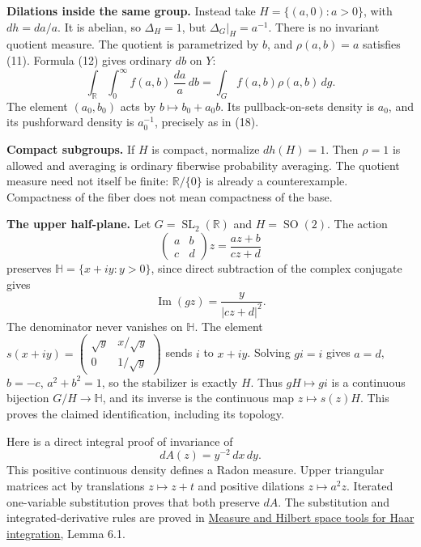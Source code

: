 \documentclass[
  english,
  11pt,
  a4paper,
]{article}
\begin{document}
\textbf{Dilations inside the same group.} Instead take
\(H=\{(a,0):a>0\}\), with \(dh=da/a\). It is abelian, so \(\Delta_H=1\),
but \(\Delta_G|_H=a^{-1}\). There is no invariant quotient measure. The
quotient is parametrized by \(b\), and \(\rho(a,b)=a\) satisfies (11).
Formula (12) gives ordinary \(db\) on \(Y\):
\[\int_{\mathbb R}\int_0^\infty f(a,b)\,\frac{da}{a}\,db
=\int_G f(a,b)\rho(a,b)\,dg.\] The element \((a_0,b_0)\) acts by
\(b\mapsto b_0+a_0b\). Its pullback-on-sets density is \(a_0\), and its
pushforward density is \(a_0^{-1}\), precisely as in (18).

\textbf{Compact subgroups.} If \(H\) is compact, normalize \(dh(H)=1\).
Then \(\rho=1\) is allowed and averaging is ordinary fiberwise
probability averaging. The quotient measure need not itself be finite:
\(\mathbb R/\{0\}\) is already a counterexample. Compactness of the
fiber does not mean compactness of the base.

\textbf{The upper half-plane.} Let \(G=\operatorname{SL}_2(\mathbb R)\)
and \(H=\operatorname{SO}(2)\). The action
\[\begin{pmatrix}a&b\\c&d\end{pmatrix}z=\frac{az+b}{cz+d}\] preserves
\(\mathbb H=\{x+iy:y>0\}\), since direct subtraction of the complex
conjugate gives \[\operatorname{Im}(gz)=\frac{y}{|cz+d|^2}.\] The
denominator never vanishes on \(\mathbb H\). The element
\(s(x+iy)=\begin{pmatrix}\sqrt y&x/\sqrt y\\0&1/\sqrt y\end{pmatrix}\)
sends \(i\) to \(x+iy\). Solving \(gi=i\) gives \(a=d\), \(b=-c\),
\(a^2+b^2=1\), so the stabilizer is exactly \(H\). Thus \(gH\mapsto gi\)
is a continuous bijection \(G/H\to\mathbb H\), and its inverse is the
continuous map \(z\mapsto s(z)H\). This proves the claimed
identification, including its topology.

Here is a direct integral proof of invariance of \[dA(z)=y^{-2}\,dx\,dy.
\tag{20}\] This positive continuous density defines a Radon measure.
Upper triangular matrices act by translations \(z\mapsto z+t\) and
positive dilations \(z\mapsto a^2z\). Iterated one-variable substitution
proves that both preserve \(dA\). The substitution and
integrated-derivative rules are proved in
\hyperref[measure-and-hilbert-space-tools]{Measure and Hilbert space
tools for Haar integration}, Lemma 6.1.
\end{document}
